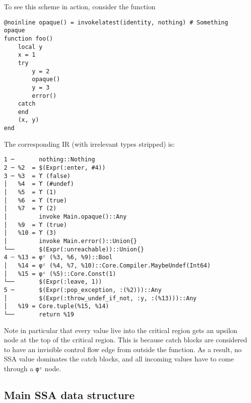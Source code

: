 To see this scheme in action, consider the function




\begin{verbatim}
@noinline opaque() = invokelatest(identity, nothing) # Something opaque
function foo()
    local y
    x = 1
    try
        y = 2
        opaque()
        y = 3
        error()
    catch
    end
    (x, y)
end
\end{verbatim}



The corresponding IR (with irrelevant types stripped) is:




\begin{lstlisting}
1 ─       nothing::Nothing
2 ─ %2  = $(Expr(:enter, #4))
3 ─ %3  = ϒ (false)
│   %4  = ϒ (#undef)
│   %5  = ϒ (1)
│   %6  = ϒ (true)
│   %7  = ϒ (2)
│         invoke Main.opaque()::Any
│   %9  = ϒ (true)
│   %10 = ϒ (3)
│         invoke Main.error()::Union{}
└──       $(Expr(:unreachable))::Union{}
4 ┄ %13 = φᶜ (%3, %6, %9)::Bool
│   %14 = φᶜ (%4, %7, %10)::Core.Compiler.MaybeUndef(Int64)
│   %15 = φᶜ (%5)::Core.Const(1)
└──       $(Expr(:leave, 1))
5 ─       $(Expr(:pop_exception, :(%2)))::Any
│         $(Expr(:throw_undef_if_not, :y, :(%13)))::Any
│   %19 = Core.tuple(%15, %14)
└──       return %19
\end{lstlisting}



Note in particular that every value live into the critical region gets an upsilon node at the top of the critical region. This is because catch blocks are considered to have an invisible control flow edge from outside the function. As a result, no SSA value dominates the catch blocks, and all incoming values have to come through a \texttt{φᶜ} node.



\hypertarget{13190851783504287053}{}


\subsection{Main SSA data structure}



